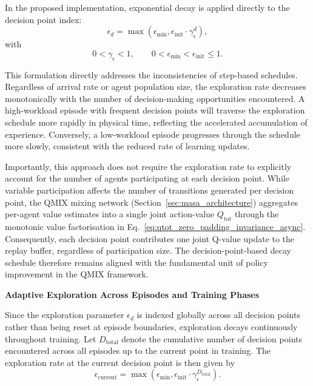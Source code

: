 In the proposed implementation, exponential decay is applied directly to the decision point index:
\begin{equation}
\epsilon_d = \max\!\left(\epsilon_{\min}, \epsilon_{\mathrm{init}} \cdot \gamma_{\epsilon}^{d}\right),
\label{eq:decision_point_based_epsilon_decay}
\end{equation}
with
\begin{equation}
0 < \gamma_{\epsilon} < 1, 
\qquad
0 < \epsilon_{\min} < \epsilon_{\mathrm{init}} \le 1.
\label{eq:epsilon_decay_parameter_constraints}
\end{equation}

This formulation directly addresses the inconsistencies of step-based schedules. Regardless of arrival rate or agent population size, the exploration rate decreases monotonically with the number of decision-making opportunities encountered. A high-workload episode with frequent decision points will traverse the exploration schedule more rapidly in physical time, reflecting the accelerated accumulation of experience. Conversely, a low-workload episode progresses through the schedule more slowly, consistent with the reduced rate of learning updates.

Importantly, this approach does not require the exploration rate to explicitly account for the number of agents participating at each decision point. While variable participation affects the number of transitions generated per decision point, the QMIX mixing network (Section~\ref{sec:masa_architecture}) aggregates per-agent value estimates into a single joint action-value $Q_{\mathrm{tot}}$ through the monotonic value factorisation in Eq.~\eqref{eq:qtot_zero_padding_invariance_async}. Consequently, each decision point contributes one joint Q-value update to the replay buffer, regardless of participation size. The decision-point-based decay schedule therefore remains aligned with the fundamental unit of policy improvement in the QMIX framework.

\textbf{Adaptive Exploration Across Episodes and Training Phases}

Since the exploration parameter $\epsilon_d$ is indexed globally across all decision points rather than being reset at episode boundaries, exploration decays continuously throughout training. Let $D_{\text{total}}$ denote the cumulative number of decision points encountered across all episodes up to the current point in training. The exploration rate at the current decision point is then given by
\begin{equation}
\epsilon_{\text{current}} = \max\!\left(\epsilon_{\min}, \epsilon_{\mathrm{init}} \cdot \gamma_{\epsilon}^{D_{\text{total}}}\right).
\label{eq:global_epsilon_decay}
\end{equation}

